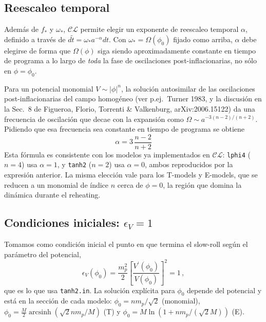 \documentclass[11pt]{article}
\newcommand{\CosmoLattice}{\ensuremath{\mathcal{C}}\text{osmo}\ensuremath{\mathcal{L}}\text{attice}\xspace}
\begin{document}
        \subsection{Reescaleo temporal}
            \label{sec:alpha}

            Además de $f_*$ y $\omega_*$, \CosmoLattice permite elegir un exponente de reescaleo temporal $\alpha$, definido a través de $d\tilde{t} = \omega_* a^{-\alpha} dt$. Con $\omega_* = \Omega(\phi_0)$ fijado como arriba, $\alpha$ debe elegirse de forma que $\Omega(\phi)$ siga siendo aproximadamente constante en tiempo de programa a lo largo de \emph{toda} la fase de oscilaciones post-inflacionarias, no sólo en $\phi = \phi_0$.

            Para un potencial monomial $V \sim |\phi|^n$, la solución autosimilar de las oscilaciones post-inflacionarias del campo homogéneo (ver p.ej.\ Turner 1983, y la discusión en la Sec.~8 de Figueroa, Florio, Torrenti \& Valkenburg, arXiv:2006.15122) da una frecuencia de oscilación que decae con la expansión como $\Omega \sim a^{-3(n-2)/(n+2)}$. Pidiendo que esa frecuencia sea constante en tiempo de programa se obtiene
            \begin{equation}
                \alpha = 3 \, \frac{n - 2}{n + 2}
            \end{equation}
            Esta fórmula es consistente con los modelos ya implementados en \CosmoLattice: \texttt{lphi4} ($n=4$) usa $\alpha = 1$, y \texttt{tanh2} ($n=2$) usa $\alpha = 0$, ambos reproducidos por la expresión anterior. La misma elección vale para los T-models y E-models, que se reducen a un monomial de índice $n$ cerca de $\phi = 0$, la región que domina la dinámica durante el reheating.

        \subsection{Condiciones iniciales: $\epsilon_V = 1$}
            \label{sec:ci}

            Tomamos como condición inicial el punto en que termina el slow-roll según el parámetro del potencial,
            \begin{equation}
                \epsilon_V(\phi_0) = \frac{m_p^2}{2} \left[ \frac{V^\prime (\phi_0)}{V(\phi_0)} \right]^2 = 1 \, ,
            \end{equation}
            que es lo que usa \texttt{tanh2.in}. La solución explícita para $\phi_0$ depende del potencial y está en la sección de cada modelo: $\phi_0 = n m_p/\sqrt 2$ (monomial), $\phi_0 = \frac{M}{2}\operatorname{arcsinh}(\sqrt2 n m_p/M)$ (T) y $\phi_0 = M\ln(1 + n m_p/(\sqrt 2 M))$ (E).
\end{document}
